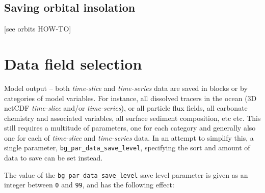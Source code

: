 \documentclass[11pt,fleqn]{book} %
\begin{document}

\subsection{Saving orbital insolation}

[see orbits HOW-TO]


\newpage


\section{Data field selection}

Model output -- both \textit{time-slice} and \textit{time-series} data are saved in blocks or  by categories of model variables. For instance, all dissolved tracers in the ocean (3D netCDF \textit{time-slice} and/or \textit{time-series}), or all particle flux fields, all carbonate chemistry and associated variables, all surface sediment composition, etc etc. This still requires a multitude of parameters, one for each category and generally also one for each of \textit{time-slice} and \textit{time-series} data. In an attempt to simplify this, a single parameter, \texttt{bg\_par\_data\_save\_level}, specifying the sort and amount of data to save can be set instead.

The value of the \texttt{bg\_par\_data\_save\_level} save level parameter is given as an integer between \texttt{0} and \texttt{99}, and has the following effect:
\end{document}
